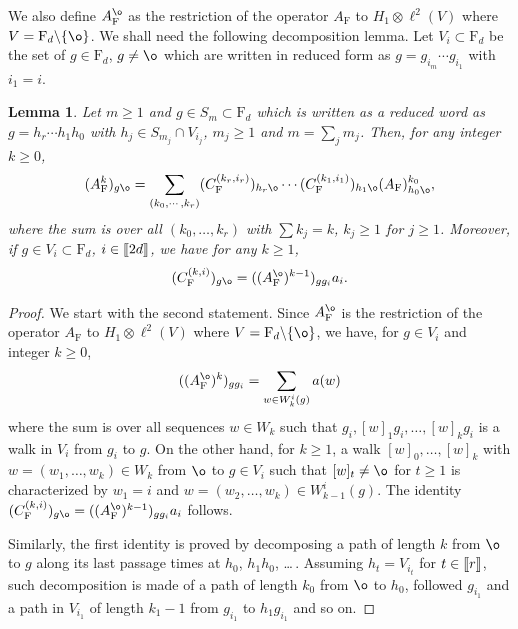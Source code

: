 \documentclass[11pt]{article}
\renewcommand{\star}{{\mathrm{F}}}
\newtheorem{lemma}{Lemma}[section]
\newcommand{\dF}{\mathrm{F}}
\newcommand{\1}{1\!\!{\sf I}}
\newcommand{\INT}[1]{{{\left[\hspace{-1.4pt}\left[#1\right]\hspace{-1.4pt}\right]}}}
\begin{document}
We also define $A_\star^{\o}$ as the restriction of the operator $A_\star$ to $H_1 \otimes \ell^2 (V)$ where $V =  \dF_d\backslash \{\o\}$. We shall need the following decomposition lemma. Let
$V_i \subset \dF_d$  be the set of $g \in \dF_d$, $g \ne \o$ which are written in reduced form as $g = g_{i_m}\cdots g_{i_1}$ with $i_1 = i$.  

\begin{lemma}\label{le:pathdecomFd}
Let $m \geq 1$ and $g \in S_m \subset \dF_d$ which is written as a reduced word as $g = h_r  \cdots h_1 h_0$ with  $h_j \in S_{m_j}\cap V_{i_j}$, $m_j \geq 1$ and $m = \sum_j m_j$. Then, for any integer $k \geq 0$,
$$
(A_\star^k)_{g \o} = \sum_{ (k_0,\cdots ,k_r)}  (C_\star^{(k_r,i_r)})_{h_r \o } \cdots (C^{(k_1,i_1)}_\star)_{h_1 \o} (A_\star)^{k_0}_{h_0 \o},
$$
where the sum is over all $(k_0,\ldots,k_r)$ with $\sum k_j  = k$, $k_j \geq 1$ for $j \geq 1$. Moreover, if $g \in V_i \subset \dF_d$, $i \in \INT{2d}$, we have for any $ k \geq 1$,
\begin{equation*}
(C_\star^{(k,i)})_{g \o}   = ((A^{\o}_\star)^{k-1} )_{g g_i} a_i . 
\end{equation*}
\end{lemma}
\begin{proof}
We start with the second statement. Since $A_\star^{\o}$ is the restriction of the operator $A_\star$ to $H_1 \otimes \ell^2 (V)$ where $V =  \dF_d\backslash \{\o\}$, we have, for $g \in V_i$ and integer $k \geq 0$,
\begin{equation*}\label{eq:Bkmgo}
((A^{\o}_\star)^{k} )_{g g_i} = \sum_{w \in W_k^i(g)} a(w)
\end{equation*}
where the sum is over all sequences $w \in W_k$  such that $g_i, [w]_1 g_i, \ldots  , [w]_k g_i$ is a walk in $V_i$ from $g_i$ to $g$.  On the other hand, for $k \geq 1$, a walk $[w]_0,\ldots, [w]_k$ with $w = (w_1,\ldots,w_k) \in W_k$ from $\o$ to $g \in V_i$ such that $[w]_t \ne \o$ for $t \geq 1$ is characterized by $w_1 = i$ and $w = (w_2,\ldots,w_k) \in W_{k-1}^i (g)$.  The identity $(C_\star^{(k,i)})_{g \o}   = ((A^{\o}_\star)^{k-1} )_{g g_i} a_i $ follows. 

Similarly, the first identity is proved by decomposing a path of length $k$ from $\o$ to $g$ along its last passage times at $h_0$, $h_1 h_0$, \ldots \,. Assuming $h_t = V_{i_t}$ for $t \in\INT{r}$, such decomposition is made of a path of length $k_0$ from $\o$ to $h_0$, followed $g_{i_1}$ and a path in $V_{i_1}$ of length $k_1-1$ from $g_{i_1}$ to $h_1g_{i_1}$ and so on. 
\end{proof}
\end{document}
